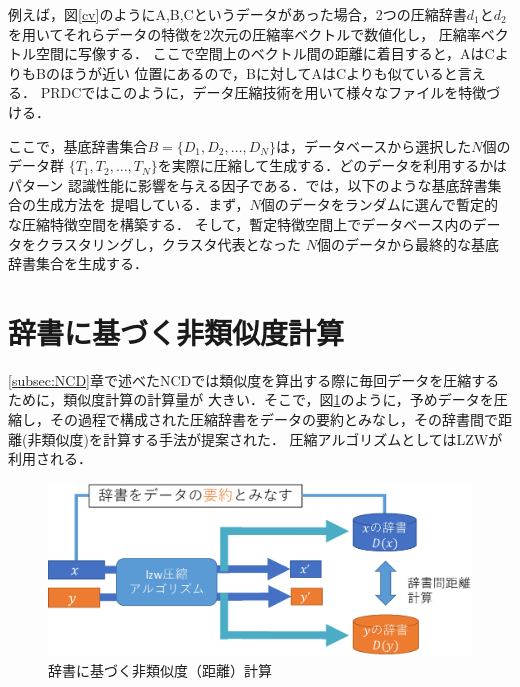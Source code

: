 例えば，図\ref{cv}のようにA,B,Cというデータがあった場合，2つの圧縮辞書$d_1$と$d_2$
を用いてそれらデータの特徴を2次元の圧縮率ベクトルで数値化し，
圧縮率ベクトル空間に写像する．
ここで空間上のベクトル間の距離に着目すると，AはCよりもBのほうが近い
位置にあるので，Bに対してAはCよりも似ていると言える．
PRDCではこのように，データ圧縮技術を用いて様々なファイルを特徴づける．


ここで，基底辞書集合$B=\{D_1,D_2,\dots,D_N\}$は，データベースから選択した$N$個のデータ群
$\{T_1,T_2,\dots,T_N\}$を実際に圧縮して生成する．どのデータを利用するかはパターン
認識性能に影響を与える因子である．\cite{PRDC}では，以下のような基底辞書集合の生成方法を
提唱している．まず，$N$個のデータをランダムに選んで暫定的な圧縮特徴空間を構築する．
そして，暫定特徴空間上でデータベース内のデータをクラスタリングし，クラスタ代表となった
$N$個のデータから最終的な基底辞書集合を生成する．


\section{辞書に基づく非類似度計算}
\ref{subsec:NCD}章で述べたNCDでは類似度を算出する際に毎回データを圧縮するために，類似度計算の計算量が
大きい．そこで，図\ref{fig:image/Create_dictionary.eps}のように，予めデータを圧縮し，その過程で構成された圧縮辞書をデータの要約とみなし，その辞書間で距離(非類似度)を計算する手法が提案された．
圧縮アルゴリズムとしてはLZWが利用される．

\begin{figure}[tb]
\begin{center}
\includegraphics[clip, width=\columnwidth]{image/Create_dictionary.eps}
\caption{辞書に基づく非類似度（距離）計算}
\label{fig:image/Create_dictionary.eps}
\end{center}
\end{figure}



